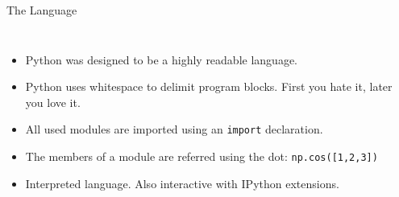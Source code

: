 \documentclass[10pt, aspectratio=169]{beamer} %
\begin{document}
\begin{frame}[fragile]{The Language}
\begin{columns}
{\small
\vspace*{-0.5cm}
\begin{itemize}
\item Python was designed to be a highly readable language.
\item Python uses whitespace to delimit program blocks. First you hate it,
later you love it.
\item All used modules are imported using an \verb+import+ declaration.
\item The members of a module are referred using the dot: \verb+np.cos([1,2,3])+
\item Interpreted language. Also interactive with IPython extensions.
\end{itemize}
}
\end{columns}
\end{frame}
\end{document}
